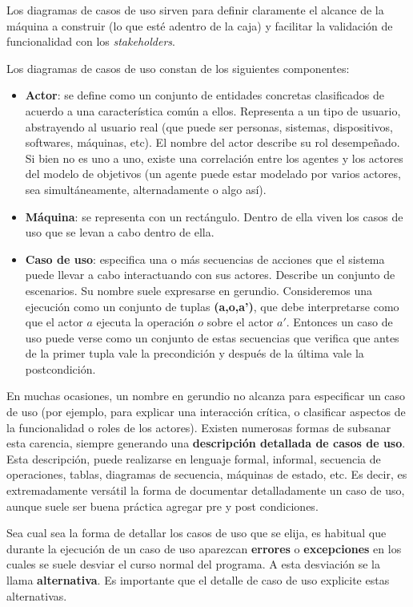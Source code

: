 \documentclass[]{article}
\begin{document}
Los diagramas de casos de uso sirven para definir claramente el alcance de la máquina a construir (lo que esté adentro de la caja) y facilitar la validación de funcionalidad con los \textit{stakeholders}.

Los diagramas de casos de uso constan de los siguientes	componentes:
\begin{itemize}
	\item \textbf{Actor}: se define como un conjunto de entidades concretas clasificados de acuerdo a una característica común a ellos. Representa a un tipo de usuario, abstrayendo al usuario real (que puede ser personas, sistemas, dispositivos, softwares, máquinas, etc). El nombre del actor describe su rol desempeñado. Si bien no es uno a uno, existe una correlación entre los agentes y los actores del modelo de objetivos (un agente puede estar modelado por varios actores, sea simultáneamente, alternadamente o algo así).
	\item \textbf{Máquina}: se representa con un rectángulo. Dentro de ella viven los casos de uso que se levan a cabo dentro de ella.
	\item \textbf{Caso de uso}: especifica una o más secuencias de acciones que el sistema puede llevar a cabo interactuando con sus actores. Describe un conjunto de escenarios. Su nombre suele expresarse en gerundio. Consideremos una ejecución como un conjunto de tuplas \textbf{(a,o,a')}, que debe interpretarse como que el actor $a$ ejecuta la operación $o$ sobre el actor $a'$. Entonces un caso de uso puede verse como un conjunto de estas secuencias que verifica que antes de la primer tupla vale la precondición y después de la última vale la postcondición.
\end{itemize}

En muchas ocasiones, un nombre en gerundio no alcanza para especificar un caso de uso (por ejemplo, para explicar una interacción crítica, o clasificar aspectos de la funcionalidad o roles de los actores). Existen numerosas formas de subsanar esta carencia, siempre generando una \textbf{descripción detallada de casos de uso}. Esta descripción, puede realizarse en lenguaje formal, informal, secuencia de operaciones, tablas, diagramas de secuencia, máquinas de estado, etc. Es decir, es extremadamente versátil la forma de documentar detalladamente un caso de uso, aunque suele ser buena práctica agregar pre y post condiciones.

Sea cual sea la forma de detallar los casos de uso que se elija, es habitual que durante la ejecución de un caso de uso aparezcan \textbf{errores} o \textbf{excepciones} en los cuales se suele desviar el curso normal del programa. A esta desviación se la llama \textbf{alternativa}. Es importante que el detalle de caso de uso explicite estas alternativas.
\end{document}
